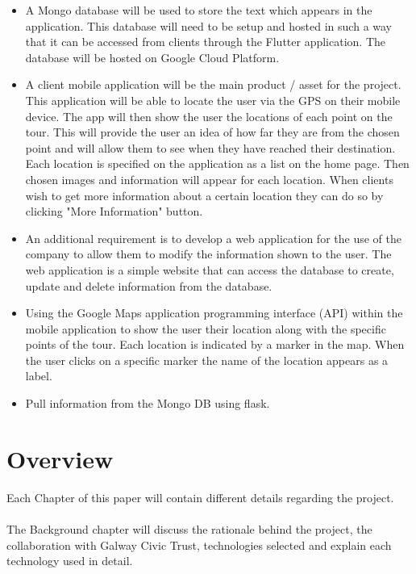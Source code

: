 \begin{itemize}
\item A Mongo database will be used to store the text which appears in the application. This database will need to be setup and hosted in such a way that it can be accessed from clients through the Flutter application. The database will be hosted on Google Cloud Platform.

\item A client mobile application will be the main product / asset for the project. This application will be able to locate the user via the GPS on their mobile device. The app will then show the user the locations of each point on the tour. This will provide the user an idea of how far they are from the chosen point and will allow them to see when they have reached their destination. Each location is specified on the application as a list on the home page. Then chosen images and information will appear for each location. When clients wish to get more information about a certain location they can do so by clicking "More Information" button.

\item An additional requirement is to develop a web application for the use of the company to allow them to modify the information shown to the user. The web application is a simple website that can access the database to create, update and delete information from the database.

\item Using the Google Maps application programming interface (API) within the mobile application to show the user their location along with the specific points of the tour. Each location is indicated by a marker in the map. When the user clicks on a specific marker the name of the location appears as a label.

\item Pull information from the Mongo DB using flask.


\end{itemize}
\section{Overview}

Each Chapter of this paper will contain different details regarding the project. 
\paragraph{}The Background chapter will discuss the rationale behind the project, the collaboration with Galway Civic Trust, technologies selected and explain each technology used in detail.
